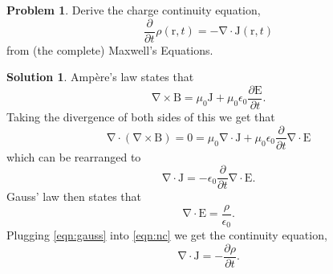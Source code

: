 \documentclass[10pt]{article}
\theoremstyle{definition}
\newtheorem{problem}{Problem}
\newtheorem{soln}{Solution}
\newcommand{\pd}[2][]{{\frac{\partial^{#1}}{\partial {{#2}^{#1}}}}}
\renewcommand{\div}[1]{\bv{\nabla}\cdot #1}
\renewcommand{\curl}[1]{\bv{\nabla}\times #1}
\newcommand{\bv}[1]{\bm{\mathrm{#1}}}
\begin{document}
\begin{problem}
Derive the charge continuity equation,
$$\pd{t}\rho(\bv{r},t)=-\div{\bv{J}(\bv{r},t)}$$
from (the complete) Maxwell's Equations.
\end{problem}
\begin{soln}
  Amp\`ere's law states that
  $$\curl{\bv{B}}=\mu_0\bv{J}+\mu_0\epsilon_0\frac{\partial \bv{E}}{\partial t}.$$
  Taking the divergence of both sides of this we get that
  $$\div{(\curl{\bv{B}})}=0=\mu_0\div{\bv{J}}+\mu_0\epsilon_0\frac{\partial}{\partial t}\div{\bv{E}}$$
  which can be rearranged to
  \begin{equation}
    \div{\bv{J}}=-\epsilon_0\frac{\partial}{\partial t}\div{\bv{E}}.
    \label{eqn:nc}
  \end{equation}
  Gauss' law then states that
  \begin{equation}
    \div{\bv{E}}=\frac{\rho}{\epsilon_0}.
    \label{eqn:gauss}
  \end{equation}
  Plugging \cref{eqn:gauss} into \cref{eqn:nc} we get the continuity equation,
  $$\div{\bv{J}}=-\frac{\partial\rho}{\partial t}.$$
\end{soln}
\end{document}

